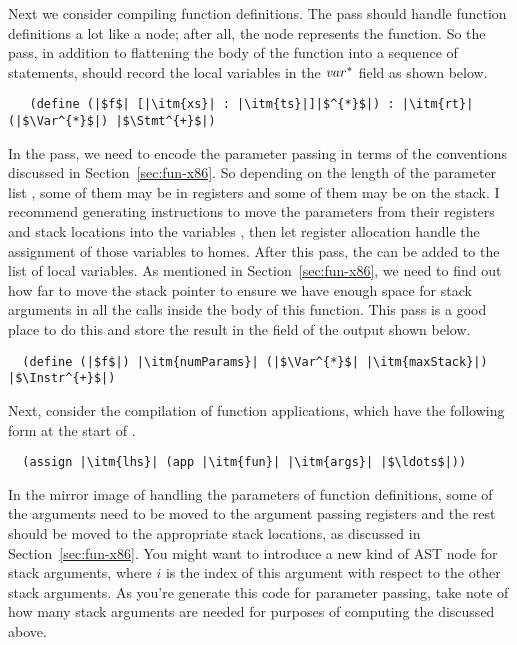 \documentclass[11pt]{book}
\begin{document}
Next we consider compiling function definitions.  The 
pass should handle function definitions a lot like a 
node; after all, the  node represents the 
function. So the  pass, in addition to flattening the
body of the function into a sequence of statements, should record the
local variables in the $\mathit{var}^{*}$ field as shown below.
\begin{lstlisting}
   (define (|$f$| [|\itm{xs}| : |\itm{ts}|]|$^{*}$|) : |\itm{rt}| (|$\Var^{*}$|) |$\Stmt^{+}$|)
\end{lstlisting}
In the  pass, we need to encode the
parameter passing in terms of the conventions discussed in
Section~\ref{sec:fun-x86}. So depending on the length of the parameter
list , some of them may be in registers and some of them may
be on the stack. I recommend generating  instructions to
move the parameters from their registers and stack locations into the
variables , then let register allocation handle the assignment
of those variables to homes. After this pass, the  can be
added to the list of local variables. As mentioned in
Section~\ref{sec:fun-x86}, we need to find out how far to move the
stack pointer to ensure we have enough space for stack arguments in
all the calls inside the body of this function. This pass is a good
place to do this and store the result in the  field of
the output  shown below.
\begin{lstlisting}
  (define (|$f$|) |\itm{numParams}| (|$\Var^{*}$| |\itm{maxStack}|) |$\Instr^{+}$|)
\end{lstlisting}

Next, consider the compilation of function applications, which have
the following form at the start of .
\begin{lstlisting}
  (assign |\itm{lhs}| (app |\itm{fun}| |\itm{args}| |$\ldots$|))
\end{lstlisting}
In the mirror image of handling the parameters of function
definitions, some of the arguments  need to be moved to the
argument passing registers and the rest should be moved to the
appropriate stack locations, as discussed in
Section~\ref{sec:fun-x86}. You might want to introduce a new kind of
AST node for stack arguments,  where $i$ is the
index of this argument with respect to the other stack arguments. As
you're generate this code for parameter passing, take note of how many
stack arguments are needed for purposes of computing the
 discussed above.
\end{document}
